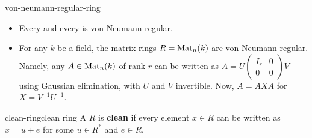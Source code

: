 \begin{example}{von-neumann-regular-ring}
    \begin{itemize}
        \item Every  and every  is von Neumann regular.
        \item For any $k$ be a field, the matrix rings $R = \textup{Mat}_n(k)$ are von Neumann regular. Namely, any $A \in \textup{Mat}_n(k)$ of rank $r$ can be written as $A = U \begin{pmatrix} I_r & 0 \\ 0 & 0 \end{pmatrix} V$ using Gaussian elimination, with $U$ and $V$ invertible. Now, $A = AXA$ for $X = V^{-1} U^{-1}$.
    \end{itemize}
\end{example}

\begin{topic}{clean-ring}{clean ring}
    A  $R$ is \textbf{clean} if every element $x \in R$ can be written as $x = u + e$ for some  $u \in R^*$ and  $e \in R$.
\end{topic}
